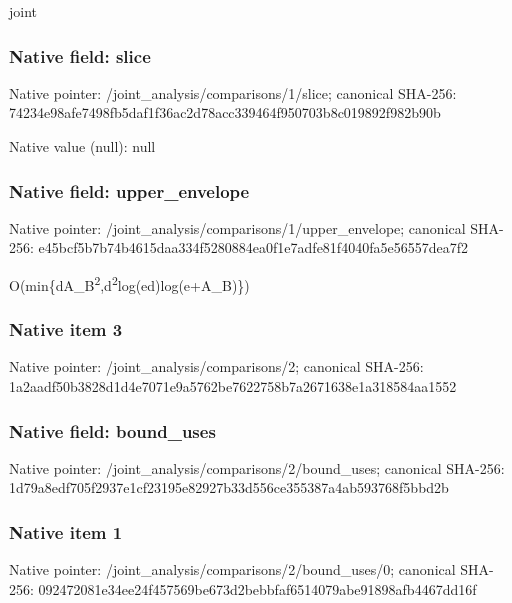 \documentclass[10pt,a4paper]{article}
\begin{document}
joint


\subsubsection{Native field: slice}


Native pointer: /joint\_analysis/comparisons/1/slice; canonical SHA-256: 74234e98afe7498fb5daf1f3\allowbreak{}6ac2d78acc339464f950703b\allowbreak{}8c019892f982b90b



Native value (null): null



\subsubsection{Native field: upper\_envelope}


Native pointer: /joint\_analysis/comparis\allowbreak{}ons/1/upper\_envelope; canonical SHA-256: e45bcf5b7b74b4615daa334f\allowbreak{}5280884ea0f1e7adfe81f404\allowbreak{}0fa5e56557dea7f2


O(min\{dA\_B\textsuperscript{2},d\textsuperscript{2}log(ed)log(e+A\_B)\})


\subsubsection{Native item 3}


Native pointer: /joint\_analysis/comparisons/2; canonical SHA-256: 1a2aadf50b3828d1d4e7071e\allowbreak{}9a5762be7622758b7a267163\allowbreak{}8e1a318584aa1552



\subsubsection{Native field: bound\_uses}


Native pointer: /joint\_analysis/comparis\allowbreak{}ons/2/bound\_uses; canonical SHA-256: 1d79a8edf705f2937e1cf231\allowbreak{}95e82927b33d556ce355387a\allowbreak{}4ab593768f5bbd2b



\subsubsection{Native item 1}


Native pointer: /joint\_analysis/comparis\allowbreak{}ons/2/bound\_uses/0; canonical SHA-256: 092472081e34ee24f457569b\allowbreak{}e673d2bebbfaf6514079abe9\allowbreak{}1898afb4467dd16f
\end{document}
